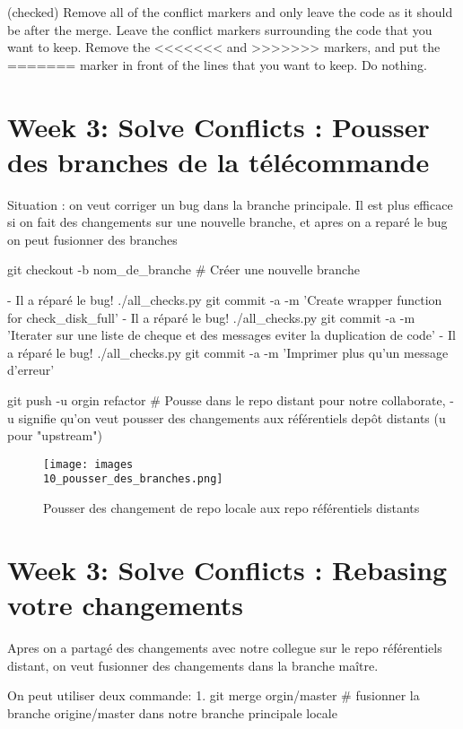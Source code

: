 \documentclass[11pt, onecolumn]{article}
\begin{document}
(checked) Remove all of the conflict markers and only leave the code as it should be after the merge.
Leave the conflict markers surrounding the code that you want to keep.
Remove the <<<<<<< and >>>>>>> markers, and put the ======= marker in front of the lines that you want to keep.
Do nothing.


\section{Week 3: Solve Conflicts : Pousser des branches de la télécommande}

Situation : on veut corriger un bug dans la branche principale. Il est plus efficace si on fait des changements sur une nouvelle branche, et apres on a reparé le bug on peut fusionner des branches

git checkout -b nom_de_branche      # Créer une nouvelle branche

- Il a réparé le bug!
./all_checks.py
git commit -a -m 'Create wrapper function for check_disk_full'
- Il a réparé le bug!
./all_checks.py
git commit -a -m 'Iterater sur une liste de cheque et des messages eviter la duplication de code'
- Il a réparé le bug!
./all_checks.py
git commit -a -m 'Imprimer plus qu'un message d'erreur'

git push -u orgin refactor      # Pousse dans le repo distant pour notre collaborate, -u signifie qu'on veut pousser des changements aux référentiels depôt distants (u pour "upstream")

\begin{figure}[h]
\begin{center}
\texttt{[image: images\\10\_pousser\_des\_branches.png]}
\end{center}
\caption{Pousser des changement de repo locale aux repo référentiels distants}
\label{10_pousser_des_branches}
\end{figure}


\section{Week 3: Solve Conflicts : Rebasing votre changements}

Apres on a partagé des changements avec notre collegue sur le repo référentiels distant, on veut fusionner des changements dans la branche maître. 

On peut utiliser deux commande: 
1. git merge orgin/master     # fusionner la branche origine/master dans notre branche principale locale
\end{document}
